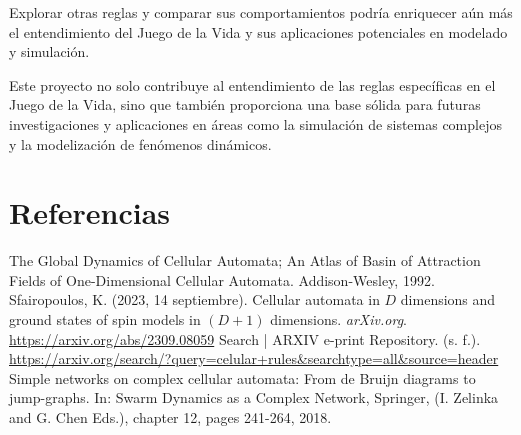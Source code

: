 \documentclass{article}
\begin{document}
 		Explorar otras reglas y comparar sus comportamientos podría enriquecer aún más el entendimiento del Juego de la Vida y sus aplicaciones potenciales en modelado y simulación.
 		
 		Este proyecto no solo contribuye al entendimiento de las reglas específicas en el Juego de la Vida, sino que también proporciona una base sólida para futuras investigaciones y aplicaciones en áreas como la simulación de sistemas complejos y la modelización de fenómenos dinámicos.
 		
 	\section{Referencias}
 	
 	\begin{thebibliography}{}
 		 The Global Dynamics of Cellular Automata; An Atlas of Basin of Attraction Fields of One-Dimensional Cellular Automata. Addison-Wesley, 1992.
 		 Sfairopoulos, K. (2023, 14 septiembre). Cellular automata in $D$ dimensions and ground states of spin models in $(D+1)$ dimensions. \textit{arXiv.org}. \url{https://arxiv.org/abs/2309.08059}
 		 Search | ARXIV e-print Repository. (s. f.). \url{https://arxiv.org/search/?query=celular+rules&searchtype=all&source=header}
 		 Simple networks on complex cellular automata: From de Bruijn diagrams to jump-graphs. In: Swarm Dynamics as a Complex Network, Springer, (I. Zelinka and G. Chen Eds.), chapter 12, pages 241-264, 2018.
 	\end{thebibliography}
 	
 		
\end{document}
